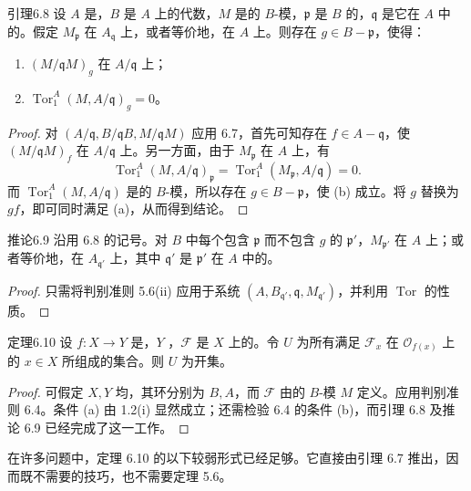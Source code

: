 \begin{SGAresult}{引理}{6.8}
设 $A$ 是，$B$ 是 $A$ 上的代数，$M$ 是的 $B$-模，$\mathfrak p$ 是 $B$ 的，$\mathfrak q$ 是它在 $A$ 中的。假定 $M_{\mathfrak p}$ 在 $A_{\mathfrak q}$ 上，或者等价地，在 $A$ 上。则存在 $g\in B-\mathfrak p$，使得：
\begin{enumerate}
\item[(a)] $(M/\mathfrak qM)_g$ 在 $A/\mathfrak q$ 上；
\item[(b)] $\operatorname{Tor}_1^A(M,A/\mathfrak q)_g=0$。
\end{enumerate}
\end{SGAresult}
\begin{proof}
对 $(A/\mathfrak q,B/\mathfrak qB,M/\mathfrak qM)$ 应用 6.7，首先可知存在 $f\in A-\mathfrak q$，使 $(M/\mathfrak qM)_f$ 在 $A/\mathfrak q$ 上。另一方面，由于 $M_{\mathfrak p}$ 在 $A$ 上，有
\[
\operatorname{Tor}_1^A(M,A/\mathfrak q)_{\mathfrak p}
=\operatorname{Tor}_1^A(M_{\mathfrak p},A/\mathfrak q)=0.
\]
而 $\operatorname{Tor}_1^A(M,A/\mathfrak q)$ 是的 $B$-模，所以存在 $g\in B-\mathfrak p$，使 (b) 成立。将 $g$ 替换为 $gf$，即可同时满足 (a)，从而得到结论。
\end{proof}

\begin{SGAresult}{推论}{6.9}
沿用 6.8 的记号。对 $B$ 中每个包含 $\mathfrak p$ 而不包含 $g$ 的 $\mathfrak p'$，$M_{\mathfrak p'}$ 在 $A$ 上；或者等价地，在 $A_{\mathfrak q'}$ 上，其中 $\mathfrak q'$ 是 $\mathfrak p'$ 在 $A$ 中的。
\end{SGAresult}
\begin{proof}
只需将判别准则 5.6(ii) 应用于系统 $(A,B_{\mathfrak q'},\mathfrak q,M_{\mathfrak q'})$，并利用 $\operatorname{Tor}$ 的性质。
\end{proof}

\begin{SGAresult}{定理}{6.10}
设 $f:X\to Y$ 是，$Y$ ，$\mathcal F$ 是 $X$ 上的。令 $U$ 为所有满足 $\mathcal F_x$ 在 $\mathcal O_{f(x)}$ 上的 $x\in X$ 所组成的集合。则 $U$ 为开集。
\end{SGAresult}
\begin{proof}
可假定 $X,Y$ 均，其环分别为 $B,A$，而 $\mathcal F$ 由的 $B$-模 $M$ 定义。应用判别准则 6.4。条件 (a) 由 1.2(i) 显然成立；还需检验 6.4 的条件 (b)，而引理 6.8 及推论 6.9 已经完成了这一工作。
\end{proof}
在许多问题中，定理 6.10 的以下较弱形式已经足够。它直接由引理 6.7 推出，因而既不需要的技巧，也不需要定理 5.6。

